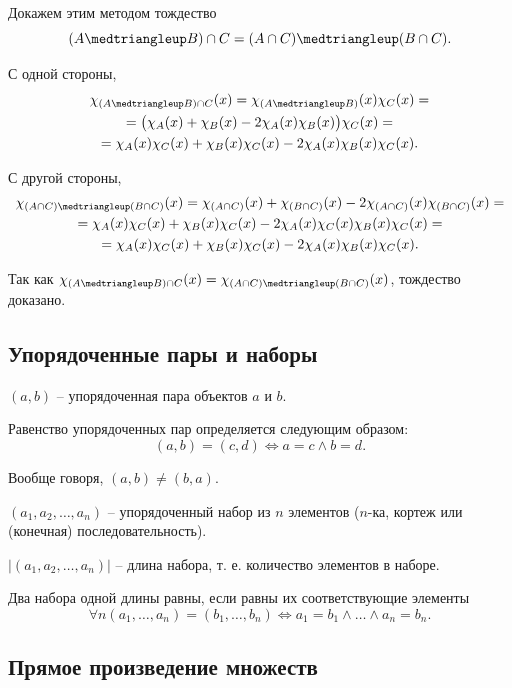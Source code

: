 Докажем этим методом тождество
\[
    (A \symdiff B) \cap C = (A \cap C) \symdiff (B \cap C).
\]

С одной стороны,
\begin{gather*}
    \chi_{(A \symdiff B) \cap C}(x) =
    \chi_{(A \symdiff B)}(x) \chi_C(x) = \\ =
    \big(\chi_A(x) + \chi_B(x) - 2 \chi_A(x) \chi_B(x)\big) \chi_C(x) = \\ =
    \chi_A(x) \chi_C(x) + \chi_B(x) \chi_C(x) - 2 \chi_A(x) \chi_B(x) \chi_C(x).
\end{gather*}

С другой стороны,
\begin{gather*}
    \chi_{(A \cap C) \symdiff (B \cap C)}(x) =
    \chi_{(A \cap C)}(x) + \chi_{(B \cap C)}(x) - 2 \chi_{(A \cap C)}(x) \chi_{(B \cap C)}(x) = \\ =
    \chi_A(x) \chi_C(x) + \chi_B(x) \chi_C(x) - 2 \chi_A(x) \chi_C(x) \chi_B(x) \chi_C(x) = \\ =
    \chi_A(x) \chi_C(x) + \chi_B(x) \chi_C(x) - 2 \chi_A(x) \chi_B(x) \chi_C(x).
\end{gather*}

Так как \(\chi_{(A \symdiff B) \cap C}(x) = \chi_{(A \cap C) \symdiff (B \cap C)}(x)\), тождество доказано.

\subsection{Упорядоченные пары и наборы}

\((a, b)\) -- упорядоченная пара объектов \(a\) и \(b\).

Равенство упорядоченных пар определяется следующим образом:
\[
    (a, b) = (c, d) \iff a = c \land b = d.
\]

Вообще говоря, \((a, b) \neq (b, a)\).

\((a_1, a_2, \ldots, a_n)\) -- упорядоченный набор из \(n\) элементов (\(n\)-ка, кортеж или (конечная) последовательность).

\(|(a_1, a_2, \ldots, a_n)|\) -- длина набора, т. е. количество элементов в наборе.

\begin{theorem*}
    Два набора одной длины равны, если равны их соответствующие элементы
    \[
        \forall n (a_1, \ldots, a_n) = (b_1, \ldots, b_n) \iff a_1 = b_1 \land \ldots \land a_n = b_n.
    \]
\end{theorem*}

\subsection{Прямое произведение множеств}

